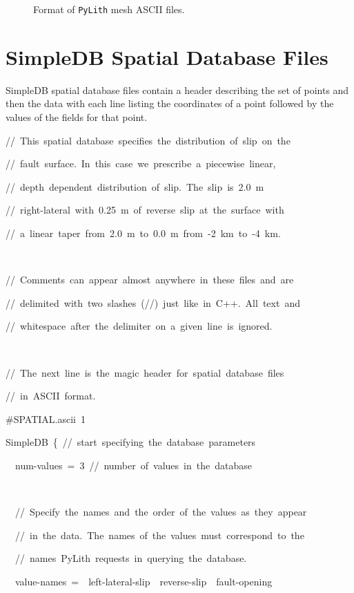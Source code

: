 \begin{figure}[H]
\caption{Format of \texttt{PyLith} mesh ASCII files.\label{fig:meshioascii:format}}
\end{figure}



\section{SimpleDB Spatial Database Files}
\label{sec:spatialdata:SimpleIOAscii}

SimpleDB spatial database files contain a header describing the set
of points and then the data with each line listing the coordinates
of a point followed by the values of the fields for that point. 
\begin{lyxcode}
//~This~spatial~database~specifies~the~distribution~of~slip~on~the

//~fault~surface.~In~this~case~we~prescribe~a~piecewise~linear,~

//~depth~dependent~distribution~of~slip.~The~slip~is~2.0~m~

//~right-lateral~with~0.25~m~of~reverse~slip~at~the~surface~with

//~a~linear~taper~from~2.0~m~to~0.0~m~from~-2~km~to~-4~km.

~

//~Comments~can~appear~almost~anywhere~in~these~files~and~are

//~delimited~with~two~slashes~(//)~just~like~in~C++.~All~text~and~

//~whitespace~after~the~delimiter~on~a~given~line~is~ignored.

~

//~The~next~line~is~the~magic~header~for~spatial~database~files~

//~in~ASCII~format.

\#SPATIAL.ascii~1

SimpleDB~\{~//~start~specifying~the~database~parameters

~~num-values~=~3~//~number~of~values~in~the~database

~

~~//~Specify~the~names~and~the~order~of~the~values~as~they~appear~

~~//~in~the~data.~The~names~of~the~values~must~correspond~to~the~

~~//~names~PyLith~requests~in~querying~the~database.

~~value-names~=~~left-lateral-slip~~reverse-slip~~fault-opening


\end{lyxcode}
